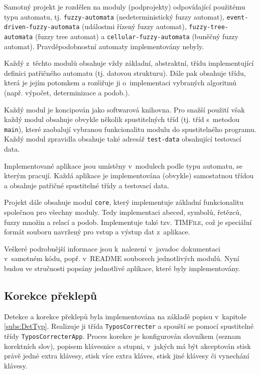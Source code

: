 Samotný projekt je rozdělen na moduly (podprojekty) odpovídající použitému typu automatu, tj. \verb|fuzzy-automata| (nedeterministický fuzzy automat), \verb|event-driven-fuzzy-automata| (událostmi řízený fuzzy automat), \verb|fuzzy-tree-automata| (fuzzy tree automat) a \verb|cellular-fuzzy-automata| (buněčný fuzzy automat). Pravděpodobnostní automaty implementovány nebyly.

Každý z~těchto modulů obsahuje vždy základní, abstraktní, třídu implementující definici patřičného automatu (tj. datovou strukturu). Dále pak obsahuje třídu, která je jejím potomkem a rozšiřuje ji o~implementaci vybraných algoritmů (např. výpočet, determinizace a podob.).

Každý modul je koncipován jako softwarová knihovna. Pro snažší použití však každý modul obsahuje obvykle několik spustitelných tříd (tj. tříd s~metodou \verb|main|), které zaobalují vybranou funkcionalitu modulu do spustitelného programu. Každý modul zpravidla obsahuje také adresář \verb|test-data| obsahující testovací data.

Implementované aplikace jsou umístěny v~modulech podle typu automatu, se kterým pracují. Každá aplikace je implementována (obvykle) samostatnou třídou a obsahuje patřičné spustitelné třídy a testovací data.

Projekt dále obsahuje modul \verb|core|, který implementuje základní funkcionalitu společnou pro všechny moduly. Tedy implementaci abeced, symbolů, řetězců, fuzzy množin a relací a podob. Implementuje také tzv. \textsc{TIMFile}, což je speciální formát souboru navržený pro vstup a výstup dat z~aplikace.

Veškeré podrobnější informace jsou k~nalezení v~javadoc dokumentaci v~samotném kódu, popř. v~\textsc{README} souborech jednotlivých modulů. Nyní budou ve stručnosti popsány jednotlivé aplikace, které byly implementovány.

\subsection{Korekce překlepů}
Detekce a korekce překlepů byla implementována na základě popisu v~kapitole \ref{subs:DetTyp}. Realizuje ji třída \verb|TyposCorrecter| a spouští se pomocí spustitelné třídy \verb|TyposCorrecterApp|. Proces korekce je konfigurován slovníkem (seznam korektních slov), popisem klávesnice a stupni, v~jakých má být akceptován stisk právě jedné extra klávesy, stisk více extra kláves, stisk jiné klávesy či vynechání klávesy.

